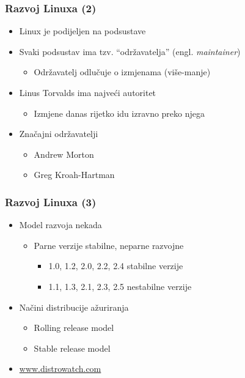 \documentclass{beamer}
\begin{document}
\begin{frame}[t]
\frametitle{Razvoj Linuxa (2)}
\begin{itemize}
  \item Linux je podijeljen na podsustave
  \item Svaki podsustav ima tzv. ``održavatelja'' (engl. 
        \emph{maintainer})
  \begin{itemize}
    \item Održavatelj odlučuje o izmjenama (više-manje)
  \end{itemize}
  \item Linus Torvalds ima najveći autoritet
  \begin{itemize}
    \item Izmjene danas rijetko idu izravno preko njega
  \end{itemize}
  \item Značajni održavatelji
  \begin{itemize}
    \item Andrew Morton
    \item Greg Kroah-Hartman
  \end{itemize}
\end{itemize}
\end{frame}

\begin{frame}[t]
\frametitle{Razvoj Linuxa (3)}
\begin{itemize}
  \item Model razvoja nekada
  \begin{itemize}
    \item Parne verzije stabilne, neparne razvojne
    \begin{itemize}
      \item 1.0, 1.2, 2.0, 2.2, 2.4 stabilne verzije
      \item 1.1, 1.3, 2.1, 2.3, 2.5 nestabilne verzije
    \end{itemize}
  \end{itemize}
  \item Načini distribucije ažuriranja
  \begin{itemize}
    \item Rolling release model
    \item Stable release model
  \end{itemize} 
  \item \url{www.distrowatch.com}
\end{itemize}
\end{frame}
\end{document}
